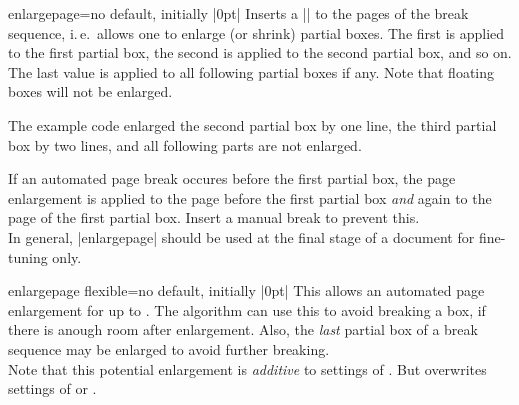 \begin{docTcbKey}{enlargepage}{=}{no default, initially |0pt|}
  Inserts a |\enlargethispage| to the pages of the break sequence,
  i.\,e.\ allows one to enlarge (or shrink) partial boxes. The first  is applied
  to the first partial box, the second  is applied
  to the second partial box, and so on. The last  value is applied
  to all following partial boxes if any. Note that floating boxes will not be enlarged.
\begin{dispListing}
\begin{tcolorbox}[breakable,enlargepage=0mm/\baselineskip/2\baselineskip/0mm,...
\end{dispListing}
  The example code enlarged the second partial box by one line, the third
  partial box by two lines, and all following parts are not enlarged.
  \begin{marker}
  If an automated page break occures before the first partial box, the
  page enlargement is applied to the page before the first partial box \emph{and}
  again to the page of the first partial box. Insert a manual break to prevent this.\\
  In general, |enlargepage| should be used at the final stage of a document
  for fine-tuning only.
  \end{marker}
\end{docTcbKey}

\clearpage
\begin{docTcbKey}{enlargepage flexible}{=}{no default, initially |0pt|}
  This allows an automated page enlargement for up to .
  The algorithm can use this to avoid breaking a box, if there is anough room
  after enlargement. Also, the \emph{last} partial box of a break sequence
  may be enlarged to avoid further breaking.\\
  Note that this potential enlargement is \emph{additive} to settings of
  .
  But  overwrites settings of
   or .
\begin{dispListing}
\end{dispListing}
\end{docTcbKey}


